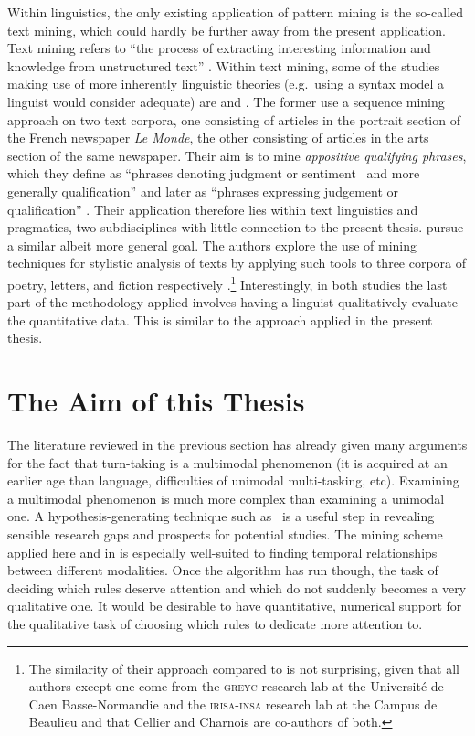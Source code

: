 Within linguistics, the only existing application of pattern mining is the so-called text mining, which could hardly be further away from the present application.
Text mining refers to ``the process of extracting interesting information and knowledge from unstructured text'' \citep[]{hotho_brief_2005}. Within text mining, some of the studies making use of more inherently linguistic theories (e.g.~using a syntax model a linguist would consider adequate) are \citet{bechet_discovering_2012} and \citet{quiniou_what_2012}.
The former use a sequence mining approach on two text corpora, one consisting of articles in the portrait section of the French newspaper \emph{Le Monde}, the other consisting of articles in the arts section of the same newspaper.
Their aim is to mine \emph{appositive qualifying phrases}, which they define as ``phrases denoting judgment or sentiment \citeellipses\ and more generally qualification'' \citep[]{bechet_discovering_2012} and later as ``phrases expressing judgement or qualification'' \citep[]{bechet_discovering_2012}.
Their application therefore lies within text linguistics and pragmatics, two subdisciplines with little connection to the present thesis.
\citet{quiniou_what_2012} pursue a similar albeit more general goal.
The authors explore the use of mining techniques for stylistic analysis of texts by applying such tools to three corpora of poetry, letters, and fiction respectively \citep[]{quiniou_what_2012}.\footnote{%
The similarity of their approach compared to \citet{bechet_discovering_2012} is not surprising, given that all authors except one come from the \textsc{greyc} research lab at the Université de Caen Basse-Normandie and the \textsc{irisa-insa} research lab at the Campus de Beaulieu and that Cellier and Charnois are co-authors of both.}
Interestingly, in both studies the last part of the methodology applied involves having a linguist qualitatively evaluate the quantitative data.
This is similar to the approach applied in the present thesis.


\section{The Aim of this Thesis}
\label{sec:introaim}
The literature reviewed in the previous section has already given many arguments for the fact that turn-taking is a multimodal phenomenon (it is acquired at an earlier age than language, difficulties of unimodal multi-tasking, etc).
Examining a multimodal phenomenon is much more complex than examining a unimodal one.
A hypothesis-generating technique such as \fpmlower\ is a useful step in revealing sensible research gaps and prospects for potential studies.
The mining scheme applied here and in \citet{rohlfing_multimodal_underreview} is especially well-suited to finding temporal relationships between different modalities.
Once the algorithm has run though, the task of deciding which rules deserve attention and which do not suddenly becomes a very qualitative one.
It would be desirable to have quantitative, numerical support for the qualitative task of choosing which rules to dedicate more attention to.

